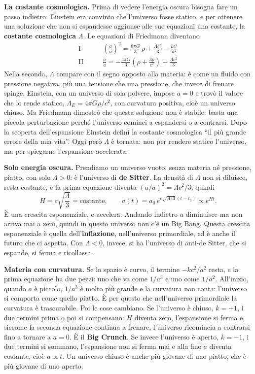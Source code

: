 \documentclass[12pt,a4paper]{article}
\begin{document}
\textbf{La costante cosmologica.} Prima di vedere l'energia oscura bisogna fare un passo indietro. Einstein era convinto che l'universo fosse statico, e per ottenere una soluzione che non si espandesse aggiunse alle sue equazioni una costante, la \textbf{costante cosmologica} $\Lambda$. Le equazioni di Friedmann diventano
\begin{align*}
\text{I} \qquad & \left(\frac{\dot a}{a}\right)^2 = \frac{8\pi G}{3}\,\rho + \frac{\Lambda c^2}{3} - \frac{k c^2}{a^2} \\[2pt]
\text{II} \qquad & \frac{\ddot a}{a} = -\frac{4\pi G}{3}\left(\rho + \frac{3p}{c^2}\right) + \frac{\Lambda c^2}{3}
\end{align*}
Nella seconda, $\Lambda$ compare con il segno opposto alla materia: è come un fluido con pressione negativa, più una tensione che una pressione, che invece di frenare spinge. Einstein, con un universo di sola polvere, impose $\ddot a = 0$ e trovò il valore che lo rende statico, $\Lambda_E = 4\pi G\rho/c^2$, con curvatura positiva, cioè un universo chiuso. Ma Friedmann dimostrò che questa soluzione non è stabile: basta una piccola perturbazione perché l'universo cominci a espandersi o a contrarsi. Dopo la scoperta dell'espansione Einstein definì la costante cosmologica ``il più grande errore della mia vita''. Oggi però $\Lambda$ è tornata: non per rendere statico l'universo, ma per spiegarne l'espansione accelerata.

\textbf{Solo energia oscura.} Prendiamo un universo vuoto, senza materia né pressione, piatto, con solo $\Lambda > 0$: è l'universo di \textbf{de Sitter}. La densità di $\Lambda$ non si diluisce, resta costante, e la prima equazione diventa $(\dot a/a)^2 = \Lambda c^2/3$, quindi
\[ H = c\sqrt{\frac{\Lambda}{3}} = \text{costante}, \qquad a(t) = a_0\, e^{c\sqrt{\Lambda/3}\,(t - t_0)} \propto e^{Ht} . \]
È una crescita esponenziale, e accelera. Andando indietro $a$ diminuisce ma non arriva mai a zero, quindi in questo universo non c'è un Big Bang. Questa crescita esponenziale è quella dell'\textbf{inflazione}, nell'universo primordiale, ed è anche il futuro che ci aspetta. Con $\Lambda < 0$, invece, si ha l'universo di anti-de Sitter, che si espande, si ferma e ricollassa.

\textbf{Materia con curvatura.} Se lo spazio è curvo, il termine $-kc^2/a^2$ resta, e la prima equazione ha due pezzi: uno che va come $1/a^3$ e uno come $1/a^2$. All'inizio, quando $a$ è piccolo, $1/a^3$ è molto più grande e la curvatura non conta: l'universo si comporta come quello piatto. È per questo che nell'universo primordiale la curvatura è trascurabile. Poi le cose cambiano. Se l'universo è chiuso, $k = +1$, i due termini prima o poi si compensano: $H$ diventa zero, l'espansione si ferma e, siccome la seconda equazione continua a frenare, l'universo ricomincia a contrarsi fino a tornare a $a = 0$. È il \textbf{Big Crunch}. Se invece l'universo è aperto, $k = -1$, i due termini si sommano, l'espansione non si ferma mai e alla fine $\dot a$ diventa costante, cioè $a \propto t$. Un universo chiuso è anche più giovane di uno piatto, che è più giovane di uno aperto.
\end{document}
